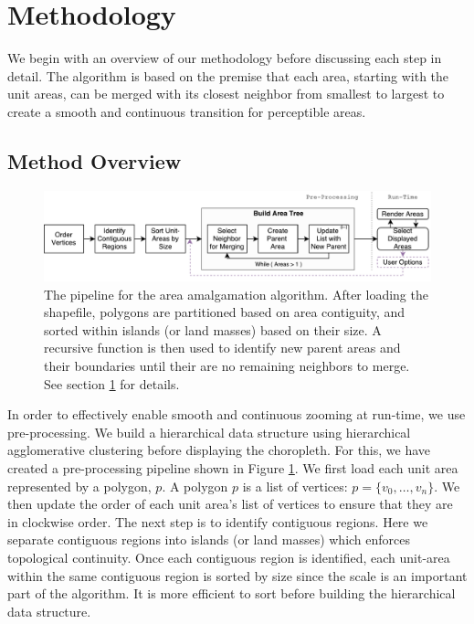\section{Methodology} \label{methodology}
We begin with an overview of our methodology before discussing each step in detail. The algorithm is based on the premise that each area, starting with the unit areas, can be merged with its closest neighbor from smallest to largest to create a smooth and continuous transition for perceptible areas.

\subsection{Method Overview} \label{overview}

\begin{figure}[t] 
\centering
\includegraphics[width=1\textwidth]{images/HorizontalFlow2}
\caption{ The pipeline for the area amalgamation algorithm. After loading the shapefile, polygons are partitioned based on area contiguity, and sorted within islands (or land masses) based on their size. A recursive function is then used to identify new parent areas and their boundaries until their are no remaining neighbors to merge. See section \ref{methodology} for details. } \label{fig:procedure} \vspace{-0.2cm}
\end{figure}

In order to effectively enable smooth and continuous zooming at run-time, we use pre-processing. We build a hierarchical data structure using hierarchical agglomerative clustering before displaying the choropleth. For this, we have created a pre-processing pipeline shown in Figure \ref{fig:procedure}. We first load each unit area represented by a polygon, $p$. A polygon $p$ is a list of vertices: $p = \{v_0,\dots,v_n\}$. We then update the order of each unit area's list of vertices to ensure that they are in clockwise order. The next step is to identify contiguous regions. Here we separate contiguous regions into islands (or land masses) which enforces topological continuity. Once each contiguous region is identified, each unit-area within the same contiguous region is sorted by size since the scale is an important part of the algorithm. It is more efficient to sort before building the hierarchical data structure.

